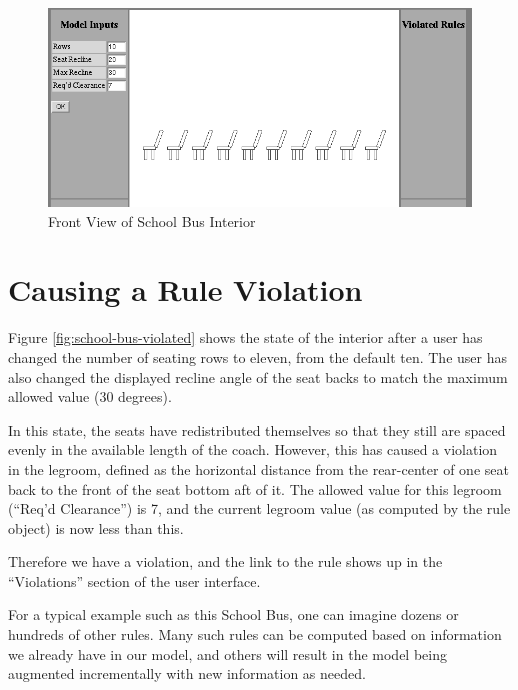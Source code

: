 \documentclass [11pt]{book}
\begin{document}
\begin{figure}
\begin{center}
\includegraphics{../images/school-bus-interior-front.png}
\end{center}

\caption{Front View of School Bus Interior}

\label{fig:school-bus-interior-front}

\end{figure}


\newpage



\section{Causing a Rule Violation}

\label{sec:causingaruleviolation}

Figure 
\ref{fig:school-bus-violated} shows the state of the interior after a user has changed the number of seating
rows to eleven, from the default ten. The user has also changed the displayed recline 
angle of the seat backs to match the maximum allowed value (30 degrees). 

In this state, the seats have redistributed themselves so that they
still are spaced evenly in the available length of the coach. However,
this has caused a violation in the legroom, defined as the horizontal
distance from the rear-center of one seat back to the front of the
seat bottom aft of it. The allowed value for this legroom (``Req'd
Clearance'') is 7, and the current legroom value (as computed by
the rule object) is now less than this.

Therefore we have a violation, and the link to the rule shows up in
the ``Violations'' section of the user interface.

For a typical example such as this School Bus, one can imagine
dozens or hundreds of other rules. Many such rules can be computed
based on information we already have in our model, and others will
result in the model being augmented incrementally with new information
as needed.
\end{document}
